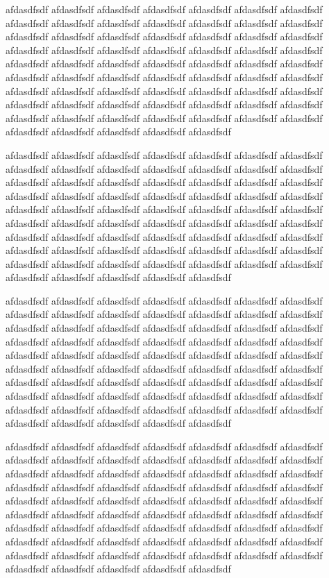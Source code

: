\documentclass[10pt]{sigplanconf}
\begin{document}
afdasdfsdf afdasdfsdf afdasdfsdf afdasdfsdf afdasdfsdf afdasdfsdf afdasdfsdf afdasdfsdf afdasdfsdf afdasdfsdf afdasdfsdf afdasdfsdf afdasdfsdf afdasdfsdf afdasdfsdf afdasdfsdf afdasdfsdf afdasdfsdf afdasdfsdf afdasdfsdf afdasdfsdf afdasdfsdf afdasdfsdf afdasdfsdf afdasdfsdf afdasdfsdf afdasdfsdf afdasdfsdf afdasdfsdf afdasdfsdf afdasdfsdf afdasdfsdf afdasdfsdf afdasdfsdf afdasdfsdf afdasdfsdf afdasdfsdf afdasdfsdf afdasdfsdf afdasdfsdf afdasdfsdf afdasdfsdf afdasdfsdf afdasdfsdf afdasdfsdf afdasdfsdf afdasdfsdf afdasdfsdf afdasdfsdf afdasdfsdf afdasdfsdf afdasdfsdf afdasdfsdf afdasdfsdf afdasdfsdf afdasdfsdf afdasdfsdf afdasdfsdf afdasdfsdf afdasdfsdf afdasdfsdf afdasdfsdf afdasdfsdf afdasdfsdf afdasdfsdf afdasdfsdf afdasdfsdf afdasdfsdf 

afdasdfsdf afdasdfsdf afdasdfsdf afdasdfsdf afdasdfsdf afdasdfsdf afdasdfsdf afdasdfsdf afdasdfsdf afdasdfsdf afdasdfsdf afdasdfsdf afdasdfsdf afdasdfsdf afdasdfsdf afdasdfsdf afdasdfsdf afdasdfsdf afdasdfsdf afdasdfsdf afdasdfsdf afdasdfsdf afdasdfsdf afdasdfsdf afdasdfsdf afdasdfsdf afdasdfsdf afdasdfsdf afdasdfsdf afdasdfsdf afdasdfsdf afdasdfsdf afdasdfsdf afdasdfsdf afdasdfsdf afdasdfsdf afdasdfsdf afdasdfsdf afdasdfsdf afdasdfsdf afdasdfsdf afdasdfsdf afdasdfsdf afdasdfsdf afdasdfsdf afdasdfsdf afdasdfsdf afdasdfsdf afdasdfsdf afdasdfsdf afdasdfsdf afdasdfsdf afdasdfsdf afdasdfsdf afdasdfsdf afdasdfsdf afdasdfsdf afdasdfsdf afdasdfsdf afdasdfsdf afdasdfsdf afdasdfsdf afdasdfsdf afdasdfsdf afdasdfsdf afdasdfsdf afdasdfsdf afdasdfsdf 

afdasdfsdf afdasdfsdf afdasdfsdf afdasdfsdf afdasdfsdf afdasdfsdf afdasdfsdf afdasdfsdf afdasdfsdf afdasdfsdf afdasdfsdf afdasdfsdf afdasdfsdf afdasdfsdf afdasdfsdf afdasdfsdf afdasdfsdf afdasdfsdf afdasdfsdf afdasdfsdf afdasdfsdf afdasdfsdf afdasdfsdf afdasdfsdf afdasdfsdf afdasdfsdf afdasdfsdf afdasdfsdf afdasdfsdf afdasdfsdf afdasdfsdf afdasdfsdf afdasdfsdf afdasdfsdf afdasdfsdf afdasdfsdf afdasdfsdf afdasdfsdf afdasdfsdf afdasdfsdf afdasdfsdf afdasdfsdf afdasdfsdf afdasdfsdf afdasdfsdf afdasdfsdf afdasdfsdf afdasdfsdf afdasdfsdf afdasdfsdf afdasdfsdf afdasdfsdf afdasdfsdf afdasdfsdf afdasdfsdf afdasdfsdf afdasdfsdf afdasdfsdf afdasdfsdf afdasdfsdf afdasdfsdf afdasdfsdf afdasdfsdf afdasdfsdf afdasdfsdf afdasdfsdf afdasdfsdf afdasdfsdf 

afdasdfsdf afdasdfsdf afdasdfsdf afdasdfsdf afdasdfsdf afdasdfsdf afdasdfsdf afdasdfsdf afdasdfsdf afdasdfsdf afdasdfsdf afdasdfsdf afdasdfsdf afdasdfsdf afdasdfsdf afdasdfsdf afdasdfsdf afdasdfsdf afdasdfsdf afdasdfsdf afdasdfsdf afdasdfsdf afdasdfsdf afdasdfsdf afdasdfsdf afdasdfsdf afdasdfsdf afdasdfsdf afdasdfsdf afdasdfsdf afdasdfsdf afdasdfsdf afdasdfsdf afdasdfsdf afdasdfsdf afdasdfsdf afdasdfsdf afdasdfsdf afdasdfsdf afdasdfsdf afdasdfsdf afdasdfsdf afdasdfsdf afdasdfsdf afdasdfsdf afdasdfsdf afdasdfsdf afdasdfsdf afdasdfsdf afdasdfsdf afdasdfsdf afdasdfsdf afdasdfsdf afdasdfsdf afdasdfsdf afdasdfsdf afdasdfsdf afdasdfsdf afdasdfsdf afdasdfsdf afdasdfsdf afdasdfsdf afdasdfsdf afdasdfsdf afdasdfsdf afdasdfsdf afdasdfsdf afdasdfsdf 
\end{document}
